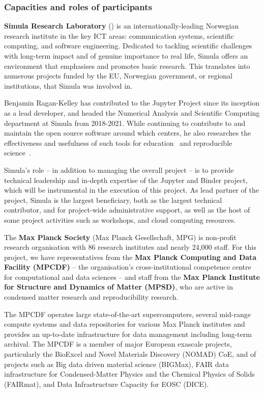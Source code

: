 \subsubsection{Capacities and roles of participants}

\noindent \textbf{Simula Research Laboratory}
() is an internationally-leading Norwegian research institute in the key
ICT areas: communication systems, scientific computing, and software
engineering. Dedicated to tackling scientific challenges with long-term impact and of
genuine importance to real life, Simula offers an environment that emphasises
and promotes basic research. This translates into numerous projects funded by
the EU, Norwegian government, or regional institutions, that Simula was
involved in.

Benjamin Ragan-Kelley has contributed to the Jupyter Project since its
inception as a lead developer, and headed the Numerical Analysis and
Scientific Computing department at Simula from 2018-2021.
While continuing to contribute to and maintain the
open source software around which \TheProject centers,
he also researches the effectiveness and usefulness of such tools for education~\cite{JupyterHub-for-education-2016}
and reproducible science~\cite{binder,Forde2018ReproducibleRE,nbval-arxiv,repo2docker-checker2020,Beg2021}.

Simula's role -- in addition to managing the overall project -- is to provide
technical leadership and in-depth expertise of the Jupyter and Binder project, which will be
instrumental in the execution of this project.
As lead partner of the project,
Simula is the largest beneficiary, both as the largest technical contributor,
and for project-wide administrative support,
as well as the host of some project activities such as workshops,
and cloud computing resources.

\medskip \noindent The \textbf{Max Planck Society}
(Max Planck Gesellschaft, MPG) is non-profit research
organisation with 86 research institutes and nearly 24,000 staff. For this
project, we have representatives from the \textbf{Max Planck Computing and Data
Facility (MPCDF)} -- the organisation's cross-institutional competence centre
for computational and data sciences -- and staff from the \textbf{Max Planck Institute
for Structure and Dynamics of Matter (MPSD)}, who are active in condensed matter research and
reproducibility research.

The MPCDF operates large state-of-the-art supercomputers, several mid-range
compute systems and data repositories for various Max Planck institutes and
provides an up-to-date infrastructure for data management including long-term
archival.
The MPCDF is a member of major European exascale projects, particularly the
BioExcel and Novel Materials Discovery (NOMAD) CoE, and of projects
such as Big data driven material science (BIGMax), FAIR data infrastructure for
Condensed-Matter Physics and the Chemical Physics of Solids (FAIRmat), and Data
Infrastructure Capacity for EOSC (DICE).

